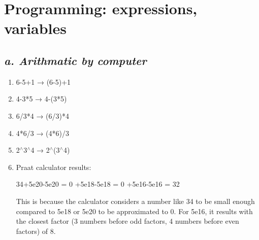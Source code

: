 \documentclass[12pt, english]{article}
\newcommand{\mysection}[2]{\setcounter{section}{#1}\addtocounter{section}{-1}\section{#2}}
\newcommand{\power}{$^\wedge$}
\begin{document}

\mysection{1}{Programming: expressions, variables}
\vspace{10pt}

\subsection*{\emph{a. Arithmatic by computer}} 
\vspace{10pt}

\begin{enumerate}
  \item[1.] 6-5+1 → (6-5)+1 \par
  \item[2.] 4-3*5 → 4-(3*5) \par
  \item[3.] 6/3*4 → (6/3)*4 \par
  \item[4.] 4*6/3 → (4*6)/3 \par
  \item[5.] 2\power3\power4 → 2\power(3\power4) \par
  \item[6.] Praat calculator results: \par
  34+5e20-5e20 = 0 +5e18-5e18 = 0 +5e16-5e16 = 32 \par
  This is because the calculator considers a number like 34 to be small enough compared to 5e18 or 5e20 to be approximated to 0. For 5e16, it results with the closest factor (3 numbers before odd factors, 4 numbers before even factors) of 8.
\end{enumerate}

\end{document}
